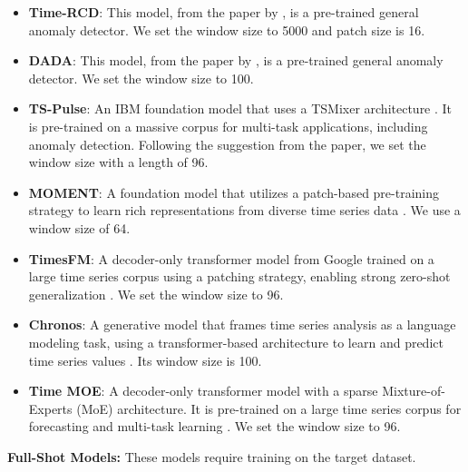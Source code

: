 \documentclass{article}
\theoremstyle{plain}
\theoremstyle{definition}
\theoremstyle{remark}
\begin{document}
\begin{itemize}
    \item \textbf{Time-RCD}: This model, from the paper by \citep{lan2025foundationmodelszeroshottime}, is a pre-trained general anomaly detector. We set the window size to 5000 and patch size is 16.
    \item \textbf{DADA}: This model, from the paper by \citep{shentu2024towards}, is a pre-trained general anomaly detector. We set the window size to 100.
    \item \textbf{TS-Pulse}: An IBM foundation model that uses a TSMixer architecture \citep{ekambaram2025tspulse}. It is pre-trained on a massive corpus for multi-task applications, including anomaly detection. Following the suggestion from the paper, we set the window size with a length of 96.
    \item \textbf{MOMENT}: A foundation model that utilizes a patch-based pre-training strategy to learn rich representations from diverse time series data \citep{goswami2024moment}. We use a window size of 64.
    \item \textbf{TimesFM}: A decoder-only transformer model from Google trained on a large time series corpus using a patching strategy, enabling strong zero-shot generalization \citep{das2024decoder}. We set the window size to 96.
    \item \textbf{Chronos}: A generative model that frames time series analysis as a language modeling task, using a transformer-based architecture to learn and predict time series values \citep{ansari2024chronos}. Its window size is 100.
    \item \textbf{Time MOE}: A decoder-only transformer model with a sparse Mixture-of-Experts (MoE) architecture. It is pre-trained on a large time series corpus for forecasting and multi-task learning \citep{shi2024time}. We set the window size to 96.
\end{itemize}

\textbf{Full-Shot Models:} These models require training on the target dataset.
\end{document}
